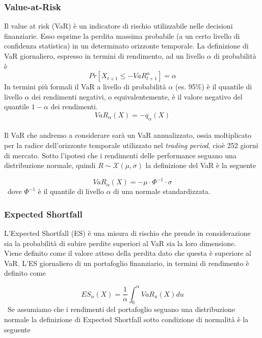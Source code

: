 \documentclass[]{article}
\begin{document}
\subsubsection*{Value-at-Risk}

Il value at risk (VaR) è un indicatore di rischio utilizzabile nelle decisioni finanziarie. Esso esprime la perdita massima probabile (a un certo livello di confidenza statistica) in un determinato orizzonte temporale.
La definizione di VaR giornaliero, espresso in termini di rendimento, ad un livello $\alpha$ di probabilità è
\begin{equation}
	Pr[X_{t+1} \le - VaR_{t+1}^{\alpha}] = \alpha
\end{equation}
In termini più formali il VaR a livello di probabilità $\alpha$ (es. 95\%) è il quantile di livello $\alpha$ dei rendimenti negativi, o equivalentemente,
è il valore negativo del quantile $1- \alpha$ dei rendimenti.
\begin{equation}
	VaR_{\alpha}(X) = - q_{\alpha}(X)
\end{equation}
\
\\
Il VaR che andremo a considerare sarà un VaR annualizzato, ossia moltiplicato per la radice dell'orizzonte temporale utilizzato nel \textit{trading period}, cioè 252 giorni di mercato.
Sotto l'ipotesi che i rendimenti delle performance seguano una distribuzione normale, quindi $R \sim \mathcal{X}(\mu,\sigma)$ la definizione del VaR è la seguente

\begin{equation}
	VaR_{\alpha}(X)=  - \mu \cdot \Phi^{-1} \cdot \sigma
\end{equation}
\
dove $\Phi^{-1}$ è il quantile di livello $\alpha$ di una normale standardizzata.


\subsubsection*{Expected Shortfall}

L'Expected Shortfall (ES) è una misura di rischio che prende in considerazione sia la probabilità di subire perdite superiori al VaR sia la loro dimensione.
\\
Viene definito come il valore atteso della perdita dato che questa è superiore al VaR.
L'ES giornaliero di un portafoglio finanziario, in termini di rendimento è definito come

\begin{equation}
	ES_{\alpha}(X)= \frac{1}{\alpha} \int_{0}^{\alpha} VaR_u(X)du
\end{equation}
\
Se assumiamo che i rendimenti del portafoglio seguano una distribuzione normale la definizione di Expected Shortfall sotto condizione di normalità è la seguente
\end{document}
